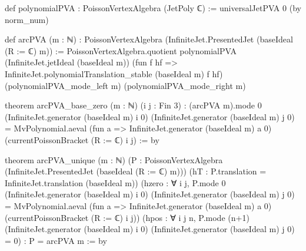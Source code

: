 \begin{leancode}
def polynomialPVA : PoissonVertexAlgebra (JetPoly ℂ) :=
  universalJetPVA 0 (by norm_num)

def arcPVA (m : ℕ) : PoissonVertexAlgebra (InfiniteJet.PresentedJet (baseIdeal (R := ℂ) m)) :=
  PoissonVertexAlgebra.quotient polynomialPVA (InfiniteJet.jetIdeal (baseIdeal m))
    (fun f hf => InfiniteJet.polynomialTranslation_stable (baseIdeal m) f hf)
    (polynomialPVA_mode_left m) (polynomialPVA_mode_right m)

theorem arcPVA_base_zero (m : ℕ) (i j : Fin 3) :
    (arcPVA m).mode 0 (InfiniteJet.generator (baseIdeal m) i 0)
      (InfiniteJet.generator (baseIdeal m) j 0) =
      MvPolynomial.aeval (fun a => InfiniteJet.generator (baseIdeal m) a 0)
        (currentPoissonBracket (R := ℂ) i j) := by

theorem arcPVA_unique (m : ℕ)
    (P : PoissonVertexAlgebra (InfiniteJet.PresentedJet (baseIdeal (R := ℂ) m)))
    (hT : P.translation = InfiniteJet.translation (baseIdeal m))
    (hzero : ∀ i j, P.mode 0 (InfiniteJet.generator (baseIdeal m) i 0)
      (InfiniteJet.generator (baseIdeal m) j 0) =
      MvPolynomial.aeval (fun a => InfiniteJet.generator (baseIdeal m) a 0)
        (currentPoissonBracket (R := ℂ) i j))
    (hpos : ∀ i j n, P.mode (n+1) (InfiniteJet.generator (baseIdeal m) i 0)
      (InfiniteJet.generator (baseIdeal m) j 0) = 0) : P = arcPVA m := by
\end{leancode}

